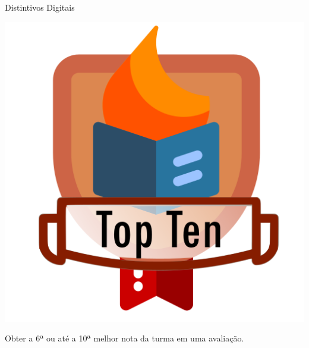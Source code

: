 \documentclass[xcolor=dvipsnames,table]{beamer}
\begin{document}
	\begin{frame}{Distintivos Digitais}
		\begin{block}{}
			\begin{center}
				\includegraphics[height=.65\textheight]{images/badges/top-ten.png}
			\end{center}		
			Obter a 6ª ou até a 10ª melhor nota da turma em uma avaliação. 
		\end{block}
	\end{frame}
	
\end{document}
